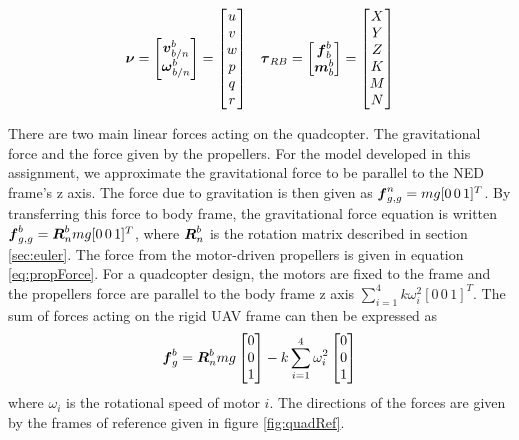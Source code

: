 \begin{align}\label{eq:allStates}
  \boldsymbol{\nu}=
  \begin{bmatrix}
    \boldsymbol{v}_{b/n}^{b}\\
    \boldsymbol{\omega}_{b/n}^{b}
  \end{bmatrix}
  =
  \begin{bmatrix}
    u\\
    v\\
    w\\
    p\\
    q\\
    r
  \end{bmatrix}
  &&
  \boldsymbol{\tau}_{RB}=
  \begin{bmatrix}
    \boldsymbol{f}_{b}^{b}\\
    \boldsymbol{m}_{b}^{b}
  \end{bmatrix}
  =
  \begin{bmatrix}
    X\\
    Y\\
    Z\\
    K\\
    M\\
    N
  \end{bmatrix}
\end{align}

There are two main linear forces acting on the quadcopter. The gravitational force and the force given by the propellers.
For the model developed in this assignment, we approximate the gravitational force to be parallel to the NED frame's z axis. The force due to gravitation is then given as $\boldsymbol{f}_{g,g}^{n}=mg [0\,0\,1]^T$. By transferring this force to
body frame, the gravitational force equation is written $\boldsymbol{f}_{g,g}^{b}=\boldsymbol{R}_{n}^{b}mg [0\,0\,1]^T$, where $\boldsymbol{R}_{n}^{b}$ is the rotation matrix described in section \ref{sec:euler}. The force from the motor-driven propellers is given in 
equation \ref{eq:propForce}. For a quadcopter design, the motors are fixed to the frame and the propellers force are parallel to the body frame z axis $\sum_{i=1}^{4}k\omega_{i}^{2}[0\,0\,1]^T$. The sum of forces acting on the rigid UAV 
frame can then be expressed as
\renewcommand*{\arraystretch}{.6}
\begin{equation}
  \boldsymbol{f}_{g}^{b}=\boldsymbol{R}_{n}^{b}mg
  \begin{bmatrix}
    0\\
    0\\
    1
  \end{bmatrix}
    -k\sum_{i=1}^{4}\omega_{i}^{2}
  \begin{bmatrix}
    0\\
    0\\
    1
  \end{bmatrix}
\end{equation}
where $\omega_i$ is the rotational speed of motor $i$. The directions of the forces are given by the frames of reference given in figure \ref{fig:quadRef}.


